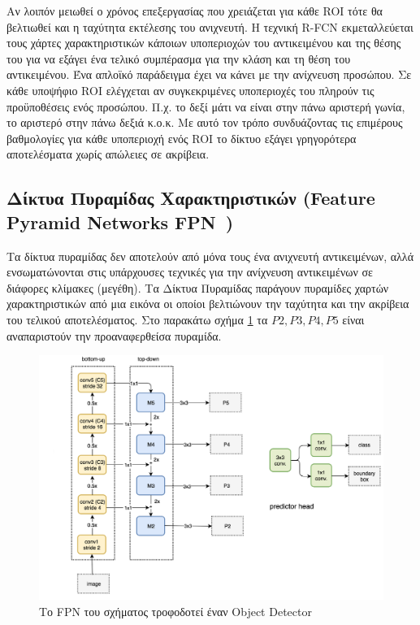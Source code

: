 Αν λοιπόν μειωθεί ο χρόνος επεξεργασίας που χρειάζεται για κάθε ROI τότε θα
βελτιωθεί και η ταχύτητα εκτέλεσης του ανιχνευτή. Η τεχνική R-FCN εκμεταλλεύεται
τους χάρτες χαρακτηριστικών κάποιων υποπεριοχών του αντικειμένου και της θέσης του
για να εξάγει ένα τελικό συμπέρασμα για την κλάση και τη θέση του αντικειμένου. Ένα
απλοϊκό παράδειγμα έχει να κάνει με την ανίχνευση προσώπου. Σε κάθε υποψήφιο ROI
ελέγχεται αν συγκεκριμένες υποπεριοχές του πληρούν τις προϋποθέσεις ενός προσώπου.
Π.χ. το δεξί μάτι να είναι στην πάνω αριστερή γωνία, το αριστερό στην πάνω δεξιά κ.ο.κ.
Με αυτό τον τρόπο συνδυάζοντας τις επιμέρους  βαθμολογίες για κάθε υποπεριοχή ενός
ROI το δίκτυο εξάγει γρηγορότερα αποτελέσματα χωρίς απώλειες σε ακρίβεια.

\subsection{Δίκτυα Πυραμίδας Χαρακτηριστικών (Feature Pyramid Networks FPN~\cite{DBLP:journals/corr/LinDGHHB16})}\label{sec:fpn}
Τα δίκτυα πυραμίδας δεν αποτελούν από μόνα τους ένα ανιχνευτή αντικειμένων, αλλά
ενσωματώνονται στις υπάρχουσες τεχνικές για την ανίχνευση αντικειμένων σε διάφορες
κλίμακες (μεγέθη). Τα Δίκτυα Πυραμίδας παράγουν πυραμίδες χαρτών χαρακτηριστικών από
μια εικόνα οι οποίοι βελτιώνουν την ταχύτητα και την ακρίβεια του τελικού αποτελέσματος.
Στο παρακάτω σχήμα \ref{fig:fpn} τα $P2, P3, P4, P5$ είναι αναπαριστούν την προαναφερθείσα πυραμίδα.

\begin{figure}[htbp]
  \begin{center}
    \includegraphics[width=0.8\maxwidth]{../figures/fpn.png}
    \caption{Το FPN του σχήματος τροφοδοτεί έναν Object Detector\label{fig:fpn}}
   \end{center}
\end{figure}

